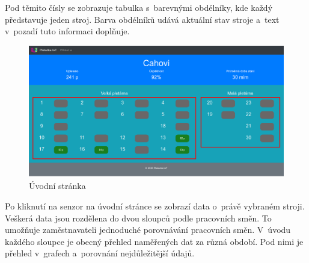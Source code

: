Pod těmito čísly se zobrazuje tabulka s~barevnými obdélníky, kde každý představuje jeden stroj.
Barva obdélníků udává aktuální stav stroje a~text v~pozadí tuto informaci doplňuje. 

\begin{figure}[htbp]
    \centering
    \includegraphics[width=\textwidth]{img/Home.png}
    \caption{Úvodní stránka}
    \label{fig:webUvod}
\end{figure}

Po kliknutí na senzor na úvodní stránce se zobrazí data o~právě vybraném stroji.
Veškerá data jsou rozdělena do dvou sloupců podle pracovních směn.
To umožňuje zaměstnavateli jednoduché porovnávání pracovních směn.
V~úvodu každého sloupce je obecný přehled naměřených dat za různá období.
Pod nimi je přehled v~grafech a~porovnání nejdůležitější údajů.

